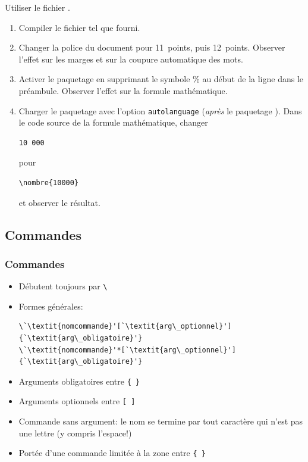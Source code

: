 \begin{exercice}
  Utiliser le fichier .

  \begin{enumerate}
  \item Compiler le fichier tel que fourni.
  \item Changer la police du document pour 11~points, puis 12~points.
    Observer l'effet sur les marges et sur la coupure automatique des
    mots.
  \item Activer le paquetage  en supprimant le symbole \%
    au début de la ligne dans le préambule. Observer l'effet sur la
    formule mathématique.
  \item Charger le paquetage  avec l'option
    \verb=autolanguage= (\emph{après} le paquetage ). Dans
    le code source de la formule mathématique, changer
\begin{lstlisting}
10 000
\end{lstlisting}
    pour
\begin{lstlisting}
\nombre{10000}
\end{lstlisting}
    et observer le résultat.
  \end{enumerate}
\end{exercice}

\subsection{Commandes}

\begin{frame}[fragile=singleslide]
  \frametitle{Commandes}
  \begin{itemize}
  \item Débutent toujours par \verb=\=
  \item Formes générales:
\begin{lstlisting}
\`\textit{nomcommande}'[`\textit{arg\_optionnel}']{`\textit{arg\_obligatoire}'}
\`\textit{nomcommande}'*[`\textit{arg\_optionnel}']{`\textit{arg\_obligatoire}'}
\end{lstlisting}
  \item Arguments obligatoires entre \verb={ }=
  \item Arguments optionnels entre \verb=[ ]=
  \item Commande sans argument: le nom se termine par tout
    caractère qui n'est pas une lettre (y compris l'espace!)
  \item Portée d'une commande limitée à la zone entre \verb={ }=
  \end{itemize}
\end{frame}

